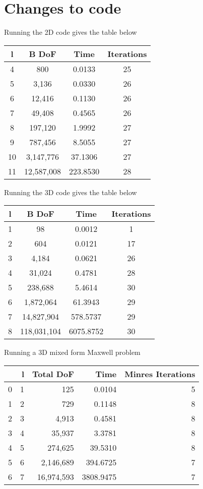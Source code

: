 \documentclass{article}
\begin{document}
\section*{Changes to code}

Running the 2D code gives the table below

\begin{tabular}{cccc}
\hline
    l &     B DoF &      Time &  Iterations \\
\hline
4 &       800 &    0.0133 &          25 \\
5 &      3,136 &    0.0330 &          26 \\
6 &     12,416 &    0.1130 &          26 \\
7 &     49,408 &    0.4565 &          26 \\
8 &    197,120 &    1.9992 &          27 \\
9 &    787,456 &    8.5055 &          27 \\
10 &   3,147,776 &   37.1306 &          27 \\
11 &  12,587,008 &  223.8530 &          28 \\
\hline
\end{tabular}


Running the 3D code gives the table below

\begin{tabular}{cccc}
\hline


    l &     B DoF &      Time &  Iterations \\
\hline
 1 &         98 &     0.0012 &           1 \\
 2 &        604 &     0.0121 &          17 \\
 3 &       4,184 &     0.0621 &          26 \\
 4 &      31,024 &     0.4781 &          28 \\
 5 &     238,688 &     5.4614 &          30 \\
 6 &    1,872,064 &    61.3943 &          29 \\
 7 &   14,827,904 &   578.5737 &          29 \\
 8 &  118,031,104 &  6075.8752 &          30 \\
\hline
\end{tabular}



Running a 3D mixed form Maxwell problem

\begin{tabular}{lrrrr}
\hline
{} &  l &     Total DoF &       Time & Minres  Iterations \\
\hline
0 &  1 &       125 &     0.0104 &           5 \\
1 &  2 &       729 &     0.1148 &           8 \\
2 &  3 &      4,913 &     0.4581 &           8 \\
3 &  4 &     35,937 &     3.3781 &           8 \\
4 &  5 &    274,625 &    39.5310 &           8 \\
5 &  6 &   2,146,689 &   394.6725 &           7 \\
6 &  7 &  16,974,593 &  3808.9475 &           7 \\
\hline
\end{tabular}
\end{document}

